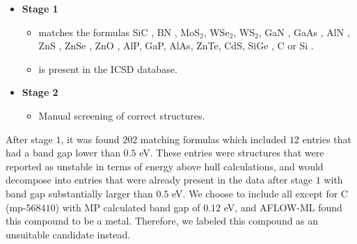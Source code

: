 \begin{itemize}
  \item[]{\textbf{Stage 1}}
  \begin{itemize}
  \item matches the formulas SiC \cite{Neudeck1995, Weber2010, Son2020, Falk2013, Martienssen2005}, BN \cite{Toth2019, Atatuere2018}, MoS$_2$\cite{Atatuere2018}, WSe$_2$\cite{Atatuere2018}, WS$_2$\cite{Atatuere2018}, GaN \cite{Berhane2018}, GaAs \cite{Wang2014}, AlN \cite{Weber2010, Xue2020}, ZnS \cite{Zhang2020}, ZnSe \cite{Weber2010}, ZnO \cite{Zhang2020}, AlP\cite{Weber2010}, GaP\cite{Weber2010}, AlAs\cite{Weber2010}, ZnTe\cite{Weber2010}, CdS\cite{Weber2010}, SiGe \cite{Hardy2019}, C \cite{Taylor2008, Barclay2011, Gordon2013} or Si \cite{Redjem2020, Zhang2020}.
  \item is present in the ICSD database.
  \end{itemize}
  \item[]{\textbf{Stage 2}}
  \begin{itemize}
  \item Manual screening of correct structures.
  \end{itemize}
\end{itemize}

\noindent After stage $1$, it was found $202$ matching formulas which included $12$ entries that had a band gap lower than $0.5$ eV. These entries were structures that were reported as unstable in terms of energy above hull calculations, and would decompose into entries that were already present in the data after stage $1$ with band gap substantially larger than $0.5$ eV. We choose to include all except for C (mp-$568410$) with MP calculated band gap of $0.12$ eV, and AFLOW-ML found this compound to be a metal. Therefore, we labeled this compound as an unsuitable candidate instead.




